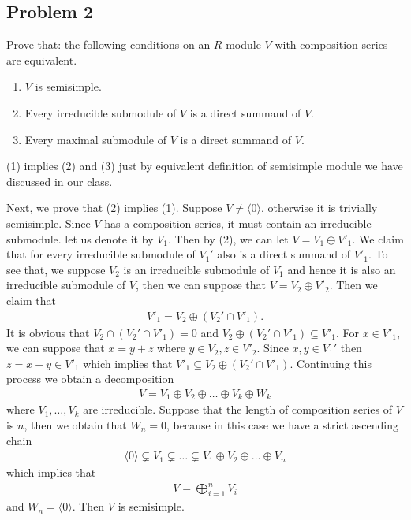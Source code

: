 \subsection*{Problem 2}
Prove that: the following conditions on an $R$-module $V$ with composition series are equivalent.
\begin{enumerate}
    \item[(1)] $V$ is semisimple.
    \item[(2)] Every irreducible submodule of $V$ is a direct summand of $V$.
    \item[(3)] Every maximal submodule of $V$ is a direct summand of $V$.
\end{enumerate}
\begin{solution}
    (1) implies (2) and (3) just by equivalent definition of semisimple module we have discussed in our class.
    
    Next, we prove that (2) implies (1).
    Suppose $V \neq \langle 0 \rangle$, otherwise it is trivially semisimple. Since $V$ has a composition series, it must contain an irreducible submodule. let us denote it by $V_1$.
    Then by (2), we can let $V=V_1\oplus V'_1$. We claim that for every irreducible submodule of $V_1'$ also is a direct summand of $V'_1$. To see that, we suppose $V_2$ is an irreducible submodule of $V_1$ and hence 
    it is also an irreducible submodule of $V$, then we can suppose that $V=V_2\oplus V'_2$. Then we claim that 
    \begin{align*}
        V'_1 = V_2\oplus (V_2'\cap V'_1).
    \end{align*}
    It is obvious that $V_2\cap(V_2'\cap V'_1)=0$ and $V_2\oplus (V_2'\cap V'_1) \subseteq V'_1$. For $x\in V'_1$, we can suppose that $x=y+z$ where $y\in V_2,z\in V'_2$.
    Since $x,y\in V_1'$ then $z=x-y\in V'_1$ which implies that $V'_1\subseteq V_2\oplus (V_2'\cap V'_1)$. 
    Continuing this process we obtain a decomposition
    \begin{align*}
        V = V_1\oplus V_2\oplus \dots \oplus V_k \oplus W_k
    \end{align*}
    where $V_1,\dots,V_k$ are irreducible. Suppose that the length of composition series of $V$ is $n$, then we obtain that $W_n=0$, because in this case we have a strict ascending chain 
    \begin{align*}
        \langle 0\rangle \subsetneq V_1\subsetneq \dots \subsetneq V_1\oplus V_2\oplus \dots \oplus V_n
    \end{align*} 
    which implies that 
    \begin{align*}
        V = \bigoplus_{i=1}^n V_i
    \end{align*}
    and $W_n=\langle 0 \rangle$. Then $V$ is semisimple.


\end{solution}
